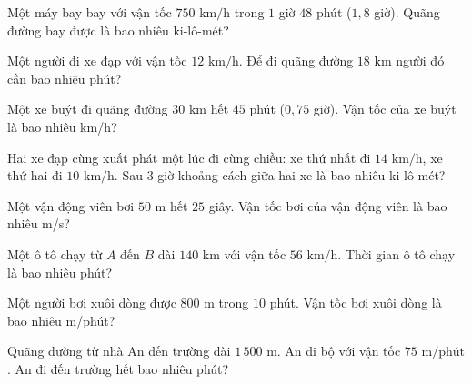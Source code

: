 \begin{ex}
  Một máy bay bay với vận tốc $750\text{ km/h}$ trong $1$ giờ $48$ phút ($1{,}8$ giờ). Quãng đường bay được là bao nhiêu ki-lô-mét?
\end{ex}

\begin{ex}
  Một người đi xe đạp với vận tốc $12\text{ km/h}$. Để đi quãng đường $18\text{ km}$ người đó cần bao nhiêu phút?
\end{ex}

\begin{ex}
  Một xe buýt đi quãng đường $30\text{ km}$ hết $45$ phút ($0{,}75$ giờ). Vận tốc của xe buýt là bao nhiêu km/h?
\end{ex}

\begin{ex}
  Hai xe đạp cùng xuất phát một lúc đi cùng chiều: xe thứ nhất đi $14\text{ km/h}$, xe thứ hai đi $10\text{ km/h}$. Sau $3$ giờ khoảng cách giữa hai xe là bao nhiêu ki-lô-mét?
\end{ex}

\begin{ex}
  Một vận động viên bơi $50\text{ m}$ hết $25$ giây. Vận tốc bơi của vận động viên là bao nhiêu m/s?
\end{ex}

\begin{ex}
  Một ô tô chạy từ $A$ đến $B$ dài $140\text{ km}$ với vận tốc $56\text{ km/h}$. Thời gian ô tô chạy là bao nhiêu phút?
\end{ex}

\begin{ex}
  Một người bơi xuôi dòng được $800\text{ m}$ trong $10$ phút. Vận tốc bơi xuôi dòng là bao nhiêu m/phút?
\end{ex}

\begin{ex}
  Quãng đường từ nhà An đến trường dài $1\,500\text{ m}$. An đi bộ với vận tốc $75\text{ m/phút}$. An đi đến trường hết bao nhiêu phút?
\end{ex}


